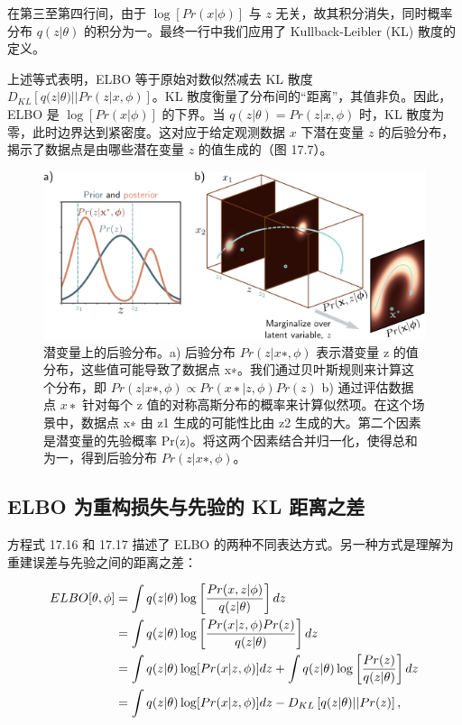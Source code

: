 在第三至第四行间，由于 \(\log[Pr(x|\phi)]\) 与 \(z\) 无关，故其积分消失，同时概率分布 \(q(z|\theta)\) 的积分为一。最终一行中我们应用了 Kullback-Leibler (KL) 散度的定义。

上述等式表明，ELBO 等于原始对数似然减去 KL 散度 \(D_{KL} [ q(z|\theta) || Pr(z|x, \phi) ]\)。KL 散度衡量了分布间的“距离”，其值非负。因此，ELBO 是 \(\log[Pr(x|\phi)]\) 的下界。当 \(q(z|\theta) = Pr(z|x, \phi)\) 时，KL 散度为零，此时边界达到紧密度。这对应于给定观测数据 \(x\) 下潜在变量 \(z\) 的后验分布，揭示了数据点是由哪些潜在变量 \(z\) 的值生成的（图 17.7）。

\begin{figure}[ht!]
\centering
\includegraphics[width=0.7\linewidth]{png/chapter17/VAENonLinearLVMPost2.png}
\caption{潜变量上的后验分布。a) 后验分布 \(Pr(z|x∗, \phi)\) 表示潜变量 z 的值分布，这些值可能导致了数据点 x∗。我们通过贝叶斯规则来计算这个分布，即 \(Pr(z|x∗, \phi) \propto Pr(x∗|z, \phi)Pr(z)\) b) 通过评估数据点 \(x∗\) 针对每个 z 值的对称高斯分布的概率来计算似然项。在这个场景中，数据点 x∗ 由 z1 生成的可能性比由 z2 生成的大。第二个因素是潜变量的先验概率 Pr(z)。将这两个因素结合并归一化，使得总和为一，得到后验分布 \(Pr(z|x∗, \phi)\)。}
\end{figure}


\subsection{ELBO 为重构损失与先验的 KL 距离之差}
方程式 17.16 和 17.17 描述了 ELBO 的两种不同表达方式。另一种方式是理解为重建误差与先验之间的距离之差：


\begin{align}
ELBO[\theta, \phi] &= \int q(z|\theta) \log \left[ \frac{Pr(x, z|\phi)}{q(z|\theta)} \right] dz \notag \\
&= \int q(z|\theta) \log \left[ \frac{Pr(x|z, \phi)Pr(z)}{q(z|\theta)} \right] dz \notag \\
&= \int q(z|\theta) \log [Pr(x|z, \phi)] dz + \int q(z|\theta) \log \left[ \frac{Pr(z)}{q(z|\theta)} \right] dz \notag \\
&= \int q(z|\theta) \log [Pr(x|z, \phi)] dz - D_{KL} \left[ q(z|\theta) || Pr(z) \right], 
\end{align} 


